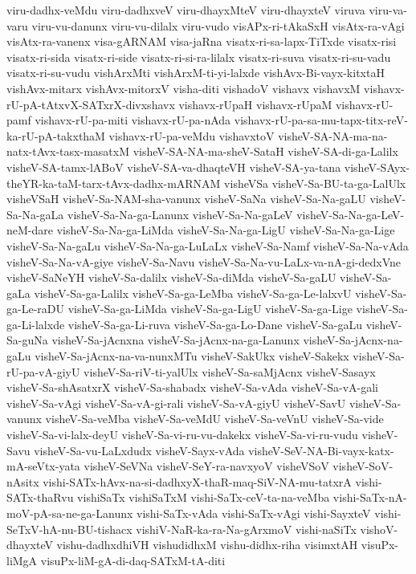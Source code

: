 {viru-dadhx-veMdu
viru-dadhxveV
viru-dhayxMteV
viru-dhayxteV
viruva
viru-va-varu
viru-vu-danunx
viru-vu-dilalx
viru-vudo
visAPx-ri-tAkaSxH
visAtx-ra-vAgi
visAtx-ra-vanenx
visa-gARNAM
visa-jaRna
visatx-ri-sa-lapx-TiTxde
visatx-risi
visatx-ri-sida
visatx-ri-side
visatx-ri-si-ra-lilalx
visatx-ri-suva
visatx-ri-su-vadu
visatx-ri-su-vudu
vishArxMti
vishArxM-ti-yi-lalxde
vishAvx-Bi-vayx-kitxtaH
vishAvx-mitarx
vishAvx-mitorxV
visha-diti
vishadoV
vishavx
vishavxM
vishavx-rU-pA-tAtxvX-SATxrX-divxshavx
vishavx-rUpaH
vishavx-rUpaM
vishavx-rU-pamf
vishavx-rU-pa-miti
vishavx-rU-pa-nAda
vishavx-rU-pa-sa-mu-tapx-titx-reV-ka-rU-pA-takxthaM
vishavx-rU-pa-veMdu
vishavxtoV
visheV-SA-NA-ma-na-natx-tAvx-tasx-masatxM
visheV-SA-NA-ma-sheV-SataH
visheV-SA-di-ga-Lalilx
visheV-SA-tamx-lABoV
visheV-SA-va-dhaqteVH
visheV-SA-ya-tana
visheV-SAyx-theYR-ka-taM-tarx-tAvx-dadhx-mARNAM
visheVSa
visheV-Sa-BU-ta-ga-LalUlx
visheVSaH
visheV-Sa-NAM-sha-vanunx
visheV-SaNa
visheV-Sa-Na-gaLU
visheV-Sa-Na-gaLa
visheV-Sa-Na-ga-Lanunx
visheV-Sa-Na-gaLeV
visheV-Sa-Na-ga-LeV-neM-dare
visheV-Sa-Na-ga-LiMda
visheV-Sa-Na-ga-LigU
visheV-Sa-Na-ga-Lige
visheV-Sa-Na-gaLu
visheV-Sa-Na-ga-LuLaLx
visheV-Sa-Namf
visheV-Sa-Na-vAda
visheV-Sa-Na-vA-giye
visheV-Sa-Navu
visheV-Sa-Na-vu-LaLx-va-nA-gi-dedxVne
visheV-SaNeYH
visheV-Sa-dalilx
visheV-Sa-diMda
visheV-Sa-gaLU
visheV-Sa-gaLa
visheV-Sa-ga-Lalilx
visheV-Sa-ga-LeMba
visheV-Sa-ga-Le-lalxvU
visheV-Sa-ga-Le-raDU
visheV-Sa-ga-LiMda
visheV-Sa-ga-LigU
visheV-Sa-ga-Lige
visheV-Sa-ga-Li-lalxde
visheV-Sa-ga-Li-ruva
visheV-Sa-ga-Lo-Dane
visheV-Sa-gaLu
visheV-Sa-guNa
visheV-Sa-jAcnxna
visheV-Sa-jAcnx-na-ga-Lanunx
visheV-Sa-jAcnx-na-gaLu
visheV-Sa-jAcnx-na-va-nunxMTu
visheV-SakUkx
visheV-Sakekx
visheV-Sa-rU-pa-vA-giyU
visheV-Sa-riV-ti-yalUlx
visheV-Sa-saMjAcnx
visheV-Sasayx
visheV-Sa-shAsatxrX
visheV-Sa-shabadx
visheV-Sa-vAda
visheV-Sa-vA-gali
visheV-Sa-vAgi
visheV-Sa-vA-gi-rali
visheV-Sa-vA-giyU
visheV-SavU
visheV-Sa-vanunx
visheV-Sa-veMba
visheV-Sa-veMdU
visheV-Sa-veVnU
visheV-Sa-vide
visheV-Sa-vi-lalx-deyU
visheV-Sa-vi-ru-vu-dakekx
visheV-Sa-vi-ru-vudu
visheV-Savu
visheV-Sa-vu-LaLxdudx
visheV-Sayx-vAda
visheV-SeV-NA-Bi-vayx-katx-mA-seVtx-yata
visheV-SeVNa
visheV-SeY-ra-navxyoV
visheVSoV
visheV-SoV-nAsitx
vishi-SATx-hAvx-na-si-dadhxyX-thaR-maq-SiV-NA-mu-tatxrA
vishi-SATx-thaRvu
vishiSaTx
vishiSaTxM
vishi-SaTx-ceV-ta-na-veMba
vishi-SaTx-nA-moV-pA-sa-ne-ga-Lanunx
vishi-SaTx-vAda
vishi-SaTx-vAgi
vishi-SayxteV
vishi-SeTxV-hA-nu-BU-tishacx
vishiV-NaR-ka-ra-Na-gArxmoV
vishi-naSiTx
vishoV-dhayxteV
vishu-dadhxdhiVH
vishudidhxM
vishu-didhx-riha
visimxtAH
visuPx-liMgA
visuPx-liM-gA-di-daq-SATxM-tA-diti
}
